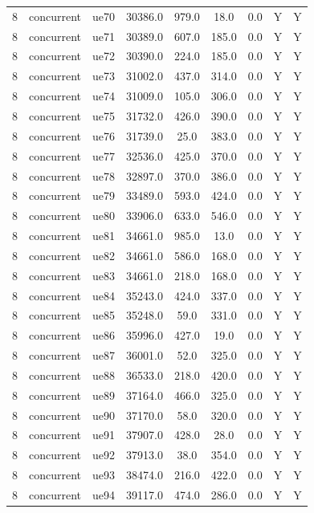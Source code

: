 \begin{table}[ht]
\begin{tabular}{|c|c|c|c|c|c|c|c|c|}
8 & concurrent & ue70 & 30386.0 & 979.0 & 18.0 & 0.0 & Y & Y \\
8 & concurrent & ue71 & 30389.0 & 607.0 & 185.0 & 0.0 & Y & Y \\
8 & concurrent & ue72 & 30390.0 & 224.0 & 185.0 & 0.0 & Y & Y \\
8 & concurrent & ue73 & 31002.0 & 437.0 & 314.0 & 0.0 & Y & Y \\
8 & concurrent & ue74 & 31009.0 & 105.0 & 306.0 & 0.0 & Y & Y \\
8 & concurrent & ue75 & 31732.0 & 426.0 & 390.0 & 0.0 & Y & Y \\
8 & concurrent & ue76 & 31739.0 & 25.0 & 383.0 & 0.0 & Y & Y \\
8 & concurrent & ue77 & 32536.0 & 425.0 & 370.0 & 0.0 & Y & Y \\
8 & concurrent & ue78 & 32897.0 & 370.0 & 386.0 & 0.0 & Y & Y \\
8 & concurrent & ue79 & 33489.0 & 593.0 & 424.0 & 0.0 & Y & Y \\
8 & concurrent & ue80 & 33906.0 & 633.0 & 546.0 & 0.0 & Y & Y \\
8 & concurrent & ue81 & 34661.0 & 985.0 & 13.0 & 0.0 & Y & Y \\
8 & concurrent & ue82 & 34661.0 & 586.0 & 168.0 & 0.0 & Y & Y \\
8 & concurrent & ue83 & 34661.0 & 218.0 & 168.0 & 0.0 & Y & Y \\
8 & concurrent & ue84 & 35243.0 & 424.0 & 337.0 & 0.0 & Y & Y \\
8 & concurrent & ue85 & 35248.0 & 59.0 & 331.0 & 0.0 & Y & Y \\
8 & concurrent & ue86 & 35996.0 & 427.0 & 19.0 & 0.0 & Y & Y \\
8 & concurrent & ue87 & 36001.0 & 52.0 & 325.0 & 0.0 & Y & Y \\
8 & concurrent & ue88 & 36533.0 & 218.0 & 420.0 & 0.0 & Y & Y \\
8 & concurrent & ue89 & 37164.0 & 466.0 & 325.0 & 0.0 & Y & Y \\
8 & concurrent & ue90 & 37170.0 & 58.0 & 320.0 & 0.0 & Y & Y \\
8 & concurrent & ue91 & 37907.0 & 428.0 & 28.0 & 0.0 & Y & Y \\
8 & concurrent & ue92 & 37913.0 & 38.0 & 354.0 & 0.0 & Y & Y \\
8 & concurrent & ue93 & 38474.0 & 216.0 & 422.0 & 0.0 & Y & Y \\
8 & concurrent & ue94 & 39117.0 & 474.0 & 286.0 & 0.0 & Y & Y \\

\end{tabular}
\end{table}

